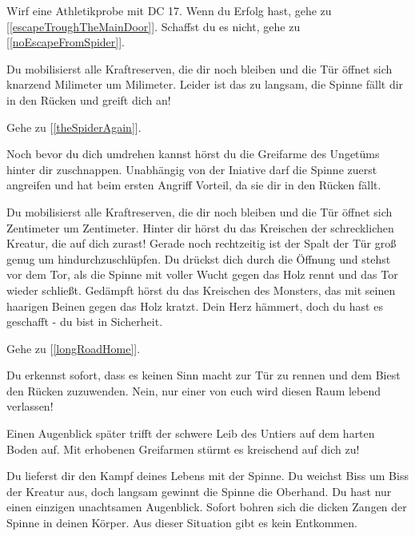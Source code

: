Wirf eine Athletikprobe mit DC 17. Wenn du Erfolg hast, gehe zu [\ref{escapeTroughTheMainDoor}]. Schaffst du es nicht, gehe zu [\ref{noEscapeFromSpider}].


Du mobilisierst alle Kraftreserven, die dir noch bleiben und die Tür öffnet sich knarzend Milimeter um Milimeter. Leider ist das zu langsam, die Spinne fällt dir in den Rücken und greift dich an!

Gehe zu [\ref{theSpiderAgain}].


Noch bevor du dich umdrehen kannst hörst du die Greifarme des Ungetüms hinter dir zuschnappen.
Unabhängig von der Iniative darf die Spinne zuerst angreifen und hat beim ersten Angriff Vorteil, da sie dir in den Rücken fällt.


Du mobilisierst alle Kraftreserven, die dir noch bleiben und die Tür öffnet sich Zentimeter um Zentimeter. Hinter dir hörst du das Kreischen der schrecklichen Kreatur, die auf dich zurast! Gerade noch rechtzeitig ist der Spalt der Tür groß genug um hindurchzuschlüpfen. Du drückst dich durch die Öffnung und stehst vor dem Tor, als die Spinne mit voller Wucht gegen das Holz rennt und das Tor wieder schließt. Gedämpft hörst du das Kreischen des Monsters, das mit seinen haarigen Beinen gegen das Holz kratzt. Dein Herz hämmert, doch du hast es geschafft - du bist in Sicherheit.

Gehe zu [\ref{longRoadHome}].


Du erkennst sofort, dass es keinen Sinn macht zur Tür zu rennen und dem Biest den Rücken zuzuwenden. Nein, nur einer von euch wird diesen Raum lebend verlassen!

Einen Augenblick später trifft der schwere Leib des Untiers auf dem harten Boden auf. Mit erhobenen Greifarmen stürmt es kreischend auf dich zu!



Du lieferst dir den Kampf deines Lebens mit der Spinne. Du weichst Biss um Biss der Kreatur aus, doch langsam gewinnt die Spinne die Oberhand. Du hast nur einen einzigen unachtsamen Augenblick. Sofort bohren sich die dicken Zangen der Spinne in deinen Körper. Aus dieser Situation gibt es kein Entkommen.

